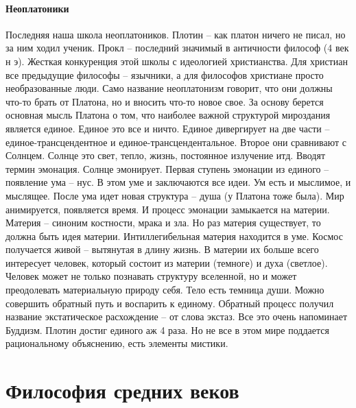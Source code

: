 \documentclass[a4paper, 12pt]{article}
\begin{document}
\paragraph{Неоплатоники}Последняя наша школа неоплатоников. Плотин -- как платон ничего не писал, но за ним ходил ученик. Прокл -- последний значимый в античности философ (4 век н э). Жесткая конкуренция этой школы с идеологией христианства. Для христиан все предыдущие философы -- язычники, а для философов христиане просто необразованные люди. Само название неоплатонизм говорит, что они должны что-то брать от Платона, но и вносить что-то новое свое. За основу берется основная мысль Платона о том, что наиболее важной структурой мироздания является единое. Единое это все и ничто. Единое дивергирует на две части -- единое-трансцендентное и единое-трансцендентальное. Второе они сравнивают с Солнцем. Солнце это свет, тепло, жизнь, постоянное излучение итд. Вводят термин эмонация. Солнце эмонирует. Первая ступень эмонации из единого -- появление ума -- нус. В этом уме и заключаются все идеи. Ум есть и мыслимое, и мыслящее. После ума идет новая структура -- душа (у Платона тоже была). Мир анимируется, появляется время. И процесс эмонации замыкается на материи. Материя -- синоним костности, мрака и зла. Но раз материя существует, то должна быть идея материи. Интиллегибельная материя находится в уме. Космос получается живой -- вытянутая в длину жизнь. В материи их больше всего интересует человек, который состоит из материи (темноге) и духа (светлое). Человек может не только познавать структуру вселенной, но и может преодолевать материальную природу себя. Тело есть темница души. Можно совершить обратный путь и воспарить к единому. Обратный процесс получил название экстатическое расхождение -- от слова экстаз. Все это очень напоминает Буддизм. Плотин достиг единого аж 4 раза. Но не все в этом мире поддается рациональному объяснению, есть элементы мистики. 


\section{Философия средних веков}
\end{document}
